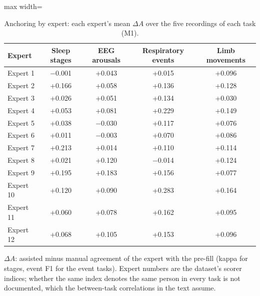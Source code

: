 \begin{table}[h!]
\centering
\footnotesize
\caption{Anchoring by expert: each expert's mean $\Delta A$ over the five recordings of each task (M1).}
\label{tab:s-experts}
\begin{adjustbox}{max width=\linewidth}
\begin{tabular}{lcccc}
\toprule
Expert & Sleep stages & EEG arousals & Respiratory events & Limb movements \\
\midrule
Expert 1 & \ensuremath{-}0.001 & +0.043 & +0.015 & +0.096 \\
Expert 2 & +0.166 & +0.058 & +0.136 & +0.128 \\
Expert 3 & +0.026 & +0.051 & +0.134 & +0.030 \\
Expert 4 & +0.053 & +0.081 & +0.229 & +0.149 \\
Expert 5 & +0.038 & \ensuremath{-}0.030 & +0.117 & +0.076 \\
Expert 6 & +0.011 & \ensuremath{-}0.003 & +0.070 & +0.086 \\
Expert 7 & +0.213 & +0.014 & +0.110 & +0.114 \\
Expert 8 & +0.021 & +0.120 & \ensuremath{-}0.014 & +0.124 \\
Expert 9 & +0.195 & +0.183 & +0.156 & +0.077 \\
Expert 10 & +0.120 & +0.090 & +0.283 & +0.164 \\
Expert 11 & +0.060 & +0.078 & +0.162 & +0.095 \\
Expert 12 & +0.068 & +0.105 & +0.153 & +0.096 \\
\bottomrule
\end{tabular}
\end{adjustbox}
\par\smallskip
\begin{minipage}{0.95\linewidth}\footnotesize $\Delta A$: assisted minus manual agreement of the expert with the pre-fill (kappa for stages, event F1 for the event tasks). Expert numbers are the dataset's scorer indices; whether the same index denotes the same person in every task is not documented, which the between-task correlations in the text assume.\end{minipage}
\end{table}
